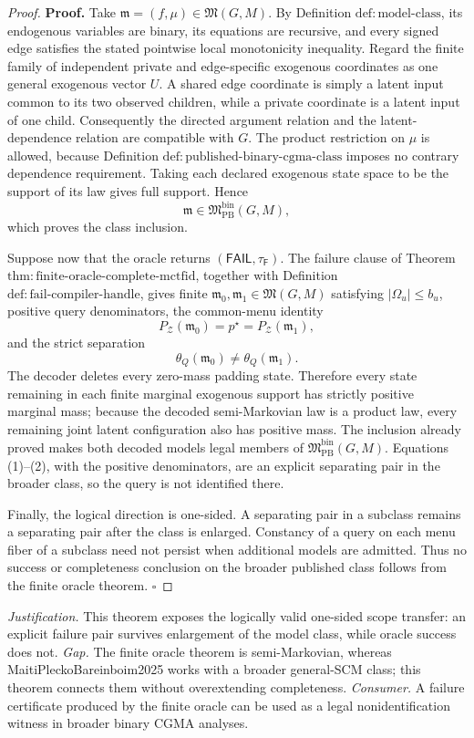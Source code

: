 \documentclass{article}
\begin{document}
\begin{proof}
\textbf{Proof.}
Take \(\mathfrak m=(f,\mu)\in\mathfrak M(G,M)\).  By Definition \(\mathrm{def:model\text{-}class}\), its endogenous variables are binary, its equations are recursive, and every signed edge satisfies the stated pointwise local monotonicity inequality.  Regard the finite family of independent private and edge-specific exogenous coordinates as one general exogenous vector \(U\).  A shared edge coordinate is simply a latent input common to its two observed children, while a private coordinate is a latent input of one child.  Consequently the directed argument relation and the latent-dependence relation are compatible with \(G\).  The product restriction on \(\mu\) is allowed, because Definition \(\mathrm{def:published\text{-}binary\text{-}cgma\text{-}class}\) imposes no contrary dependence requirement.  Taking each declared exogenous state space to be the support of its law gives full support.  Hence
\[
 \mathfrak m\in\mathfrak M_{\mathrm{PB}}^{\mathrm{bin}}(G,M),
\]
which proves the class inclusion.

Suppose now that the oracle returns \((\mathsf{FAIL},\tau_{\mathsf F})\).  The failure clause of Theorem \(\mathrm{thm:finite\text{-}oracle\text{-}complete\text{-}mctfid}\), together with Definition \(\mathrm{def:fail\text{-}compiler\text{-}handle}\), gives finite \(\mathfrak m_0,\mathfrak m_1\in\mathfrak M(G,M)\) satisfying \(|\Omega_u|\le b_u\), positive query denominators, the common-menu identity
\[
 P_{\mathcal Z}(\mathfrak m_0)=p^{\star}=P_{\mathcal Z}(\mathfrak m_1),
\tag{1}
\]
and the strict separation
\[
 \theta_Q(\mathfrak m_0)\ne\theta_Q(\mathfrak m_1).
\tag{2}
\]
The decoder deletes every zero-mass padding state.  Therefore every state remaining in each finite marginal exogenous support has strictly positive marginal mass; because the decoded semi-Markovian law is a product law, every remaining joint latent configuration also has positive mass.  The inclusion already proved makes both decoded models legal members of \(\mathfrak M_{\mathrm{PB}}^{\mathrm{bin}}(G,M)\).  Equations (1)--(2), with the positive denominators, are an explicit separating pair in the broader class, so the query is not identified there.

Finally, the logical direction is one-sided.  A separating pair in a subclass remains a separating pair after the class is enlarged.  Constancy of a query on each menu fiber of a subclass need not persist when additional models are admitted.  Thus no success or completeness conclusion on the broader published class follows from the finite oracle theorem. \(\square\)
\end{proof}
\par\smallskip\noindent \textit{Justification.} This theorem exposes the logically valid one-sided scope transfer: an explicit failure pair survives enlargement of the model class, while oracle success does not. \textit{Gap.} The finite oracle theorem is semi-Markovian, whereas MaitiPleckoBareinboim2025 works with a broader general-SCM class; this theorem connects them without overextending completeness. \textit{Consumer.} A failure certificate produced by the finite oracle can be used as a legal nonidentification witness in broader binary CGMA analyses.
\end{document}
